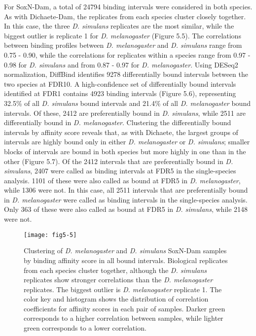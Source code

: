 For SoxN-Dam, a total of 24794 binding intervals were considered in both species. As with Dichaete-Dam, the replicates from each species cluster closely together. In this case, the three \emph{D. simulans} replicates are the most similar, while the biggest outlier is replicate 1 for \emph{D. melanogaster} (Figure 5.5). The correlations between binding profiles between \emph{D. melanogaster} and \emph{D. simulans} range from 0.75 - 0.90, while the correlations for replicates within a species range from 0.97 - 0.98 for \emph{D. simulans} and from 0.87 - 0.97 for \emph{D. melanogaster}. Using DESeq2 normalization, DiffBind identifies 9278 differentially bound intervals between the two species at FDR10. A high-confidence set of differentially bound intervals identified at FDR1 contains 4923 binding intervals (Figure 5.6), representing 32.5\% of all \emph{D. simulans} bound intervals and 21.4\% of all \emph{D. melanogaster} bound intervals. Of these, 2412 are preferentially bound in \emph{D. simulans}, while 2511 are differentially bound in \emph{D. melanogaster}. Clustering the differentially bound intervals by affinity score reveals that, as with Dichaete, the largest groups of intervals are highly bound only in either \emph{D. melanogaster} or \emph{D. simulans}; smaller blocks of intervals are bound in both species but more highly in one than in the other (Figure 5.7). Of the 2412 intervals that are preferentially bound in \emph{D. simulans}, 2407 were called as binding intervals at FDR5 in the single-species analysis. 1101 of these were also called as bound at FDR5 in \emph{D. melanogaster}, while 1306 were not. In this case, all 2511 intervals that are preferentially bound in \emph{D. melanogaster} were called as binding intervals in the single-species analysis. Only 363 of these were also called as bound at FDR5 in \emph{D. simulans}, while 2148 were not.

\begin{figure}
\centering
\texttt{[image: fig5-5]}
\caption[Clustering of \emph{D. melanogaster} and \emph{D. simulans} SoxN-Dam samples by binding affinity score in all bound intervals]{Clustering of \emph{D. melanogaster} and \emph{D. simulans} SoxN-Dam samples by binding affinity score in all bound intervals. Biological replicates from each species cluster together, although the \emph{D. simulans} replicates show stronger correlations than the \emph{D. melanogaster} replicates. The biggest outlier is \emph{D. melanogaster} replicate 1. The color key and histogram shows the distribution of correlation coefficients for affinity scores in each pair of samples. Darker green corresponds to a higher correlation between samples, while lighter green corresponds to a lower correlation.}
\label{Figure 5.5}
\end{figure}

